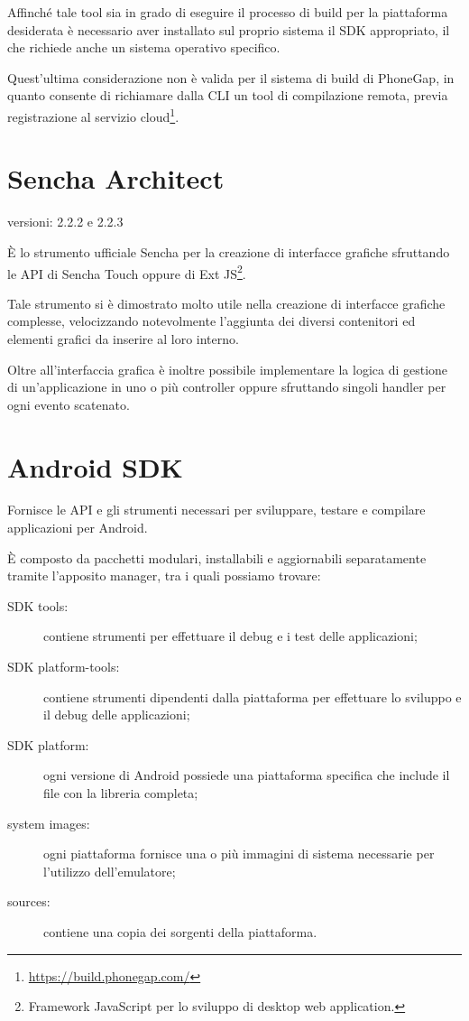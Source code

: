 Affinché tale tool sia in grado di eseguire il processo di build per la piattaforma desiderata è necessario aver installato sul proprio sistema il \ac{SDK} appropriato, il che richiede anche un sistema operativo specifico.

Quest'ultima considerazione non è valida per il sistema di build di PhoneGap, in quanto consente di richiamare dalla \ac{CLI} un tool di compilazione remota, previa registrazione al servizio cloud\footnote{\url{https://build.phonegap.com/}}.

\section{Sencha Architect}
\begin{description}
\item[versioni: 2.2.2 e 2.2.3]
\end{description}

È lo strumento ufficiale Sencha per la creazione di interfacce grafiche sfruttando le \ac{API} di Sencha Touch oppure di Ext JS\footnote{Framework JavaScript per lo  sviluppo di desktop web application.}.

Tale strumento si è dimostrato molto utile nella creazione di interfacce grafiche complesse, velocizzando notevolmente l'aggiunta dei diversi contenitori ed elementi grafici da inserire al loro interno.

Oltre all'interfaccia grafica è inoltre possibile implementare la logica di gestione di un'applicazione in uno o più controller oppure sfruttando singoli handler per ogni evento scatenato.

\section{Android SDK}
Fornisce le \ac{API} e gli strumenti necessari per sviluppare, testare e compilare applicazioni per Android.

È composto da pacchetti modulari, installabili e aggiornabili separatamente tramite l'apposito manager, tra i quali possiamo trovare:
\begin{description}
\item[SDK tools:] contiene strumenti per effettuare il debug e i test delle applicazioni;
\item[SDK platform-tools:] contiene strumenti dipendenti dalla piattaforma per effettuare lo sviluppo e il debug delle applicazioni;
\item[SDK platform:] ogni versione di Android possiede una piattaforma specifica che include il file  con la libreria completa;
\item[system images:] ogni piattaforma fornisce una o più immagini di sistema necessarie per l'utilizzo dell'emulatore;
\item[sources:] contiene una copia dei sorgenti della piattaforma.
\end{description}

